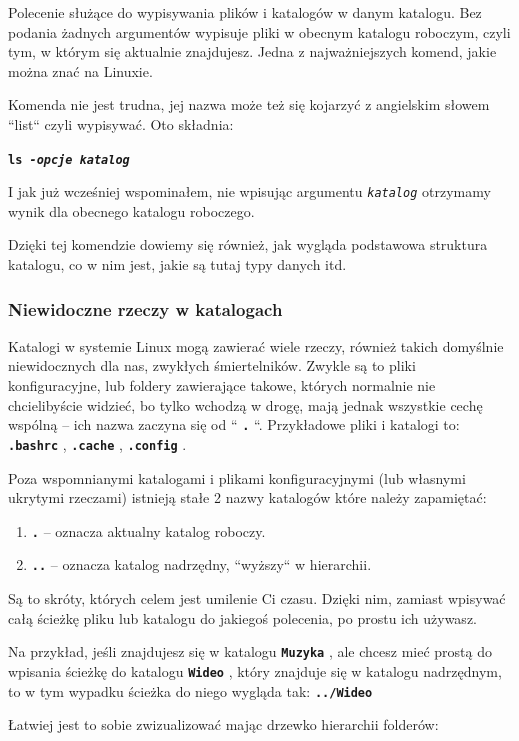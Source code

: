 \documentclass[12pt]{article}
\newcommand{\ttbf}[1]{
    \texttt{\textbf{#1}}
}
\begin{document}
Polecenie służące do wypisywania plików i katalogów w danym katalogu. Bez podania żadnych argumentów wypisuje pliki w obecnym katalogu roboczym, czyli tym, w którym się aktualnie znajdujesz. Jedna z najważniejszych komend, jakie można znać na Linuxie.

Komenda nie jest trudna, jej nazwa może też się kojarzyć z angielskim słowem ``list`` czyli wypisywać. Oto składnia:

\ttbf{ls \emph{-opcje} \emph{katalog}}

I jak już wcześniej wspominałem, nie wpisując argumentu \texttt{\emph{katalog}} otrzymamy wynik dla obecnego katalogu roboczego.

Dzięki tej komendzie dowiemy się również, jak wygląda podstawowa struktura katalogu, co w nim jest, jakie są tutaj typy danych itd.

\subsubsection{Niewidoczne rzeczy w katalogach}

Katalogi w systemie Linux mogą zawierać wiele rzeczy, również takich domyślnie niewidocznych dla nas, zwykłych śmiertelników. Zwykle są to pliki konfiguracyjne, lub foldery zawierające takowe, których normalnie nie chcielibyście widzieć, bo tylko wchodzą w drogę, mają jednak wszystkie cechę wspólną -- ich nazwa zaczyna się od ``\ttbf{.}``. Przykładowe pliki i katalogi to: \ttbf{.bashrc}, \ttbf{.cache}, \ttbf{.config}.

Poza wspomnianymi katalogami i plikami konfiguracyjnymi (lub własnymi ukrytymi rzeczami) istnieją stałe 2 nazwy katalogów które należy zapamiętać:
\begin{enumerate}
    \item \ttbf{.} -- oznacza aktualny katalog roboczy.
    \item \ttbf{..} -- oznacza katalog nadrzędny, ``wyższy`` w hierarchii.
\end{enumerate}

Są to skróty, których celem jest umilenie Ci czasu. Dzięki nim, zamiast wpisywać całą ścieżkę pliku lub katalogu do jakiegoś polecenia, po prostu ich używasz.

Na przykład, jeśli znajdujesz się w katalogu \ttbf{Muzyka}, ale chcesz mieć prostą do wpisania ścieżkę do katalogu \ttbf{Wideo}, który znajduje się w katalogu nadrzędnym, to w tym wypadku ścieżka do niego wygląda tak: \ttbf{../Wideo}

Łatwiej jest to sobie zwizualizować mając drzewko hierarchii folderów:
\end{document}
